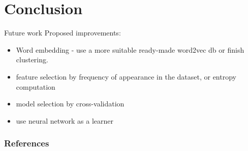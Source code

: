 \documentclass[xcolor=table]{beamer}
\begin{document}
 
    
 
    


  
  

    






\section{Conclusion}
\begin{frame}{Future work}
Proposed improvements:
\begin{itemize}
    \item Word embedding - use a more suitable ready-made word2vec db or finish clustering.
    \item feature selection by frequency of appearance in the dataset, or entropy computation
    \item model selection by cross-validation
    \item use neural network as a learner
\end{itemize}


\end{frame}


\begin{frame}[allowframebreaks]
        \frametitle{References}
        \nocite{*}
        
        
\end{frame}
\end{document}
